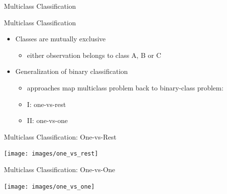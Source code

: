 \begin{frame}[c]{Multiclass Classification}

\begin{block}{Multiclass Classification}
\begin{itemize}
  \item Classes are mutually exclusive
  \begin{itemize}
    \item either observation belongs to class A, B or C
  \end{itemize}
  \item Generalization of binary classification
  \begin{itemize}
    \item approaches map multiclass problem back to binary-class problem:
    \item I: one-vs-rest
    \item II: one-vs-one
  \end{itemize}
\end{itemize}
\end{block}

\end{frame}
\begin{frame}[c]{Multiclass Classification: One-vs-Rest}

\texttt{[image: images/one\_vs\_rest]}

\end{frame}
\begin{frame}[c]{Multiclass Classification: One-vs-One}

\texttt{[image: images/one\_vs\_one]}

\end{frame}
